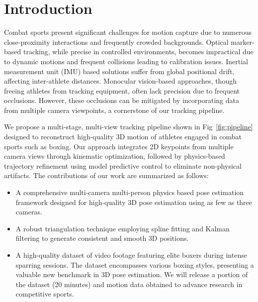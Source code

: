 \documentclass{egpubl}
\begin{document}
\section{Introduction}
Combat sports present significant challenges for motion capture due to numerous close-proximity interactions and frequently crowded backgrounds. Optical marker-based tracking, while precise in controlled environments, becomes impractical due to dynamic motions and frequent collisions leading to calibration issues. Inertial measurement unit (IMU) based solutions suffer from global positional drift, affecting inter-athlete distances. Monocular vision-based approaches, though freeing athletes from tracking equipment, often lack precision due to frequent occlusions. However, these occlusions can be mitigated by incorporating data from multiple camera viewpoints, a cornerstone of our tracking pipeline.

We propose a multi-stage, multi-view tracking pipeline shown in Fig~\ref{fig:pipeline} designed to reconstruct high-quality 3D motion of athletes engaged in combat sports such as boxing. Our approach integrates 2D keypoints from multiple camera views through kinematic optimization, followed by physics-based trajectory refinement using model predictive control to eliminate non-physical artifacts. 
The contributions of our work are summarized as follows:
\begin{itemize}
    \item A comprehensive multi-camera multi-person physics based pose estimation framework designed for high-quality 3D pose estimation using as few as three cameras.
    \item A robust triangulation technique employing spline fitting and Kalman filtering to generate consistent and smooth 3D positions.
    \item A high-quality dataset of video footage featuring elite boxers during intense sparring sessions. The dataset encompasses various boxing styles, presenting a valuable new benchmark in 3D pose estimation. We will release a portion of the dataset (20 minutes) and motion data obtained to advance research in competitive sports.
\end{itemize}



\label{sec:results} 


  
\end{document}
